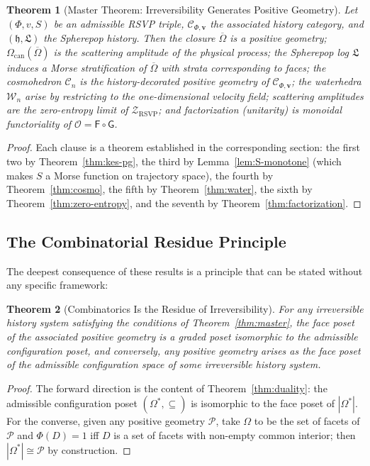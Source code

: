 \documentclass[12pt, oneside]{amsart}
\theoremstyle{plain}
\newtheorem{theorem}{Theorem}[section]
\theoremstyle{definition}
\theoremstyle{remark}
\newcommand{\Phif}{\Phi}
\newcommand{\vf}{v}
\newcommand{\Sf}{S}
\newcommand{\OmKS}{\Omega}
\newcommand{\hist}{\mathfrak{h}}
\newcommand{\Log}{\mathfrak{L}}
\newcommand{\Cosmo}{\mathcal{C}_n}
\newcommand{\Water}{\mathcal{W}_n}
\newcommand{\CF}{\Omega_{\mathrm{can}}}
\newcommand{\Ccat}{\mathcal{C}_{\Phi,\mathbf{v}}}
\newcommand{\Gfun}{\mathsf{G}}
\newcommand{\Ffun}{\mathsf{F}}
\newcommand{\Ofun}{\mathcal{O}}
\newcommand{\ZRSVP}{\mathcal{Z}_{\mathrm{RSVP}}}
\begin{document}
\begin{theorem}[Master Theorem: Irreversibility Generates Positive Geometry]
Let $(\Phif, \vf, \Sf)$ be an admissible RSVP triple, $\Ccat$ the associated history category, and $(\hist, \Log)$ the Spherepop history. Then the closure $\overline{\OmKS}$ is a positive geometry; $\CF(\overline{\OmKS})$ is the scattering amplitude of the physical process; the Spherepop log $\Log$ induces a Morse stratification of $\overline{\OmKS}$ with strata corresponding to faces; the cosmohedron $\Cosmo$ is the history-decorated positive geometry of $\Ccat$; the waterhedra $\Water$ arise by restricting to the one-dimensional velocity field; scattering amplitudes are the zero-entropy limit of $\ZRSVP$; and factorization (unitarity) is monoidal functoriality of $\Ofun = \Ffun \circ \Gfun$.
\end{theorem}

\begin{proof}
Each clause is a theorem established in the corresponding section: the first two by Theorem~\ref{thm:kes-pg}, the third by Lemma~\ref{lem:S-monotone} (which makes $\Sf$ a Morse function on trajectory space), the fourth by Theorem~\ref{thm:cosmo}, the fifth by Theorem~\ref{thm:water}, the sixth by Theorem~\ref{thm:zero-entropy}, and the seventh by Theorem~\ref{thm:factorization}.
\end{proof}

\subsection{The Combinatorial Residue Principle}

The deepest consequence of these results is a principle that can be stated without any specific framework:

\begin{theorem}[Combinatorics Is the Residue of Irreversibility]
For any irreversible history system satisfying the conditions of Theorem~\ref{thm:master}, the face poset of the associated positive geometry is a graded poset isomorphic to the admissible configuration poset, and conversely, any positive geometry arises as the face poset of the admissible configuration space of some irreversible history system.
\end{theorem}

\begin{proof}
The forward direction is the content of Theorem~\ref{thm:duality}: the admissible configuration poset $(\OmKS^*, \subseteq)$ is isomorphic to the face poset of $|\OmKS^*|$. For the converse, given any positive geometry $\mathcal{P}$, take $\OmKS$ to be the set of facets of $\mathcal{P}$ and $\Phif(D) = 1$ iff $D$ is a set of facets with non-empty common interior; then $|\OmKS^*| \cong \mathcal{P}$ by construction.
\end{proof}
\end{document}
